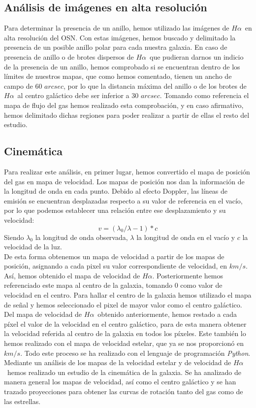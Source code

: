 \documentclass{article}
\newcommand{\hal}{$H\alpha$}
\begin{document}
\subsection{Análisis de imágenes en alta resolución}
Para determinar la presencia de un anillo, hemos utilizado las imágenes de \hal\ en alta resolución del OSN. Con estas imágenes, hemos buscado y delimitado la presencia de un posible anillo polar para cada nuestra galaxia. En caso de presencia de anillo o de brotes dispersos de \hal\ que pudieran darnos un indicio de la presencia de un anillo, hemos comprobado si se encuentran dentro de los límites de nuestros mapas, que como hemos comentado, tienen un ancho de campo de 60 $arcsec$, por lo que la distancia máxima del anillo o de los brotes de \hal\ al centro galáctico debe ser inferior a 30 $arcsec$. Tomando como referencia el mapa de flujo del gas hemos realizado esta comprobación, y en caso afirmativo, hemos delimitado dichas regiones para poder realizar a partir de ellas el resto del estudio.
\subsection{Cinemática}
Para realizar este análisis, en primer lugar, hemos convertido el mapa de posición del gas en mapa de velocidad. Los mapas de posición nos dan la información de la longitud de onda en cada punto. Debido al efecto Doppler, las líneas de emisión se encuentran desplazadas respecto a su valor de referencia en el vacío, por lo que podemos establecer una relación entre ese desplazamiento y su velocidad:
\begin{equation}
v=(\lambda_{0}/\lambda - 1)*c \label{ecuacion_1}
\end{equation}
Siendo $\lambda_{0}$ la longitud de onda observada, $\lambda$ la longitud de onda en el vacío y $c$ la velocidad de la luz.\\De esta forma obtenemos un mapa de velocidad a partir de los mapas de posición, asignando a cada pixel su valor correspondiente de velocidad, en $km/s$. Así, hemos obtenido el mapa de velocidad de \hal. Posteriormente hemos referenciado este mapa al centro de la galaxia, tomando 0 como valor de velocidad en el centro. Para hallar el centro de la galaxia hemos utilizado el mapa de señal y hemos seleccionado el pixel de mayor valor como el centro galáctico. Del mapa de velocidad de \hal\ obtenido anteriormente, hemos restado a cada píxel el valor de la velocidad en el centro galáctico, para de esta manera obtener la velocidad referida al centro de la galaxia en todos los píxeles. Este también lo hemos realizado con el mapa de velocidad estelar, que ya se nos proporcionó en $km/s$. Todo este proceso se ha realizado con el lenguaje de programación \emph{Python}.\\Mediante un análisis de los mapas de la velocidad estelar y de velocidad de \hal\ hemos realizado un estudio de la cinemática de la galaxia. Se ha analizado de manera general los mapas de velocidad, así como el centro galáctico y se han trazado proyecciones para obtener las curvas de rotación tanto del gas como de las estrellas.
\end{document}
